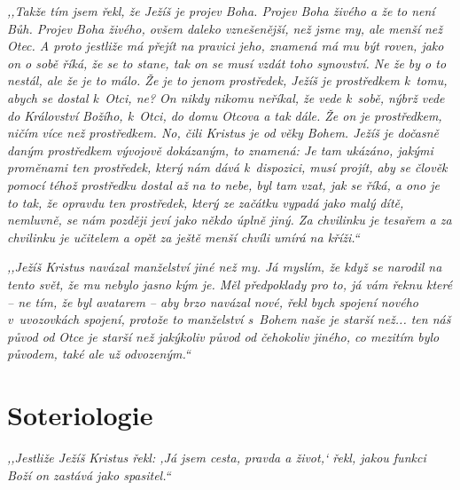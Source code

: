 \textit{%
,,Takže tím jsem řekl, že Ježíš je projev Boha. Projev Boha živého a že to
není Bůh. Projev Boha živého, ovšem daleko vznešenější, než jsme my, ale menší
než Otec. A proto jestliže má přejít na pravici jeho, znamená má mu být
roven, jako on o sobě říká, že se to stane, tak on se musí vzdát toho synovství.
Ne že by o to nestál, ale že je to
málo. Že je to jenom prostředek, Ježíš je prostředkem k~tomu, abych se dostal
k~Otci, ne? On nikdy
nikomu neříkal, že vede k~sobě, nýbrž vede do Království Božího, k~Otci, do domu Otcova a
tak dále. Že on je prostředkem, ničím více než prostředkem. No, čili Kristus je
od věky Bohem.
Ježíš je dočasně daným prostředkem vývojově dokázaným, to znamená: Je tam
ukázáno,
jakými proměnami ten prostředek, který nám dává k~dispozici, musí projít, aby se
člověk pomocí téhož prostředku dostal až na to nebe, byl tam  vzat, jak se říká, a ono je
to tak, že opravdu ten prostředek, který ze začátku vypadá jako malý dítě,
nemluvně, se
nám později jeví jako někdo úplně jiný. Za chvilinku je tesařem a za chvilinku je
učitelem a opět za ještě menší chvíli umírá na kříži.``
}

\textit{%
,,Ježíš Kristus navázal manželství jiné než my. Já myslím, že když se narodil na
tento svět, že mu nebylo jasno kým je. Měl předpoklady pro to, já vám řeknu
které -- ne tím, že byl avatarem -- aby brzo navázal nové, řekl bych spojení
nového v~uvozovkách spojení, protože to manželství s~Bohem naše je starší než...
ten náš původ od Otce je starší než jakýkoliv původ od čehokoliv jiného, co
mezitím bylo původem, také ale už odvozeným.``
}

\section{Soteriologie}

\textit{%
,,Jestliže Ježíš Kristus řekl: ,Já jsem cesta, pravda a život,` řekl, jakou
funkci Boží on zastává jako spasitel.``
}

